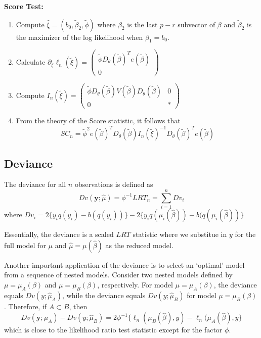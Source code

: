 \documentclass[12pt]{article}
\newcommand{\bhat}{\hat{\beta}}
\newcommand{\btilde}{\tilde{\beta}}
\numberwithin{equation}{section}
\begin{document}
\textbf{Score Test:} \\
\begin{enumerate}
  \item Compute $\hat{\xi} = (b_0, \btilde_2, \tilde{\phi})$ where $\beta_2$ is the last $p-r$ subvector of $\beta$ and $\btilde_2$ is the maximizer of the log likelihood when $\beta_1 = b_0$.
  \item Calculate $\partial_{\xi} \ell_n(\tilde{\xi})
    = \begin{pmatrix}
      \tilde{\phi} D_\theta(\btilde)^T e(\btilde) \\ 0
    \end{pmatrix}
    $
%
  \item Compute $I_n(\tilde{\xi}) =
  \begin{pmatrix}
    \tilde{\phi} D_{\theta}(\btilde) V(\btilde) D_{\theta}(\btilde) & 0 \\
    0 & *
  \end{pmatrix}
  $
  \item From the theory of the Score statistic, it follows that
  \begin{equation*}
    SC_n = \tilde{\phi}^2 e(\btilde)^T D_{\theta}(\btilde) I_n(\tilde{\xi})^{-1} D_{\theta}(\btilde)^T e(\btilde)
  \end{equation*}
\end{enumerate}
%


\subsection{Deviance}
The deviance for all $n$ observations is defined as
\begin{equation*}
  Dv(\mathbf{y}; \hat{\mu}) = \phi^{-1} LRT_n = \sum_{i=1}^n Dv_i
\end{equation*}
where $Dv_i = 2\{ y_i q(y_i) - b(q(y_i)) \} - 2\{y_i q(\mu_i(\bhat)) - b(q(\mu_i(\bhat))\}$

Essentially, the deviance is a scaled $LRT$ statistic where we substitue in $y$ for the full model for $\mu$ and $\hat{\mu} = \mu(\bhat)$ as the reduced model.

Another important application of the deviance is to select an
`optimal' model from a sequence of nested models. Consider two
nested models defined by $\mu = \mu_A(\beta)$ and $\mu = \mu_B(\beta)$, respectively. For model $\mu = \mu_A(\beta)$, the deviance equals 
$Dv(y; \hat{\mu}_A)$, while the deviance equals $Dv(y; \hat{\mu}_B)$ for model $\mu = \mu_B(\beta)$. Therefore, if $A \subset B$, then
\begin{equation*}
  Dv(\mathbf{y}; \hat{\mu}_A) - Dv(y; \hat{\mu}_B) =
    2 \phi^{-1} \{ \ell_n(\mu_B(\bhat), y) - \ell_n(\mu_A(\bhat), y \}
\end{equation*}
which is close to the likelihood ratio test statistic except for the factor $\phi$. 
\end{document}
